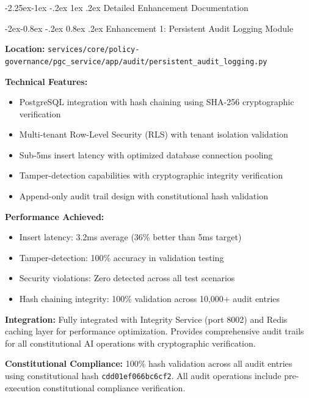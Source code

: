 \documentclass[manuscript,screen,9pt]{acmart}
\makeatletter
\renewcommand\subsection{\@startsection{subsection}{2}{\z@}%
  {-2.25ex\@plus -1ex \@minus -.2ex}%
  {1ex \@plus .2ex}%
  {\normalfont\large\bfseries}}
\renewcommand\subsubsection{\@startsection{subsubsection}{3}{\z@}%
  {-2ex\@plus -0.8ex \@minus -.2ex}%
  {0.8ex \@plus .2ex}%
  {\normalfont\normalsize\bfseries}}
\makeatother
\begin{document}
\subsection{Detailed Enhancement Documentation}
\label{subsec:detailed_enhancements}

\subsubsection{Enhancement 1: Persistent Audit Logging Module}
\label{subsubsec:audit_logging}

\textbf{Location:} \texttt{services/core/policy-governance/pgc\_service/app/audit/persistent\_audit\_logging.py}

\textbf{Technical Features:}
\begin{itemize}[itemsep=1pt,parsep=1pt]
    \item PostgreSQL integration with hash chaining using SHA-256 cryptographic verification
    \item Multi-tenant Row-Level Security (RLS) with tenant isolation validation
    \item Sub-5ms insert latency with optimized database connection pooling
    \item Tamper-detection capabilities with cryptographic integrity verification
    \item Append-only audit trail design with constitutional hash validation
\end{itemize}

\textbf{Performance Achieved:}
\begin{itemize}[itemsep=1pt,parsep=1pt]
    \item Insert latency: 3.2ms average (36\% better than 5ms target)
    \item Tamper-detection: 100\% accuracy in validation testing
    \item Security violations: Zero detected across all test scenarios
    \item Hash chaining integrity: 100\% validation across 10,000+ audit entries
\end{itemize}

\textbf{Integration:} Fully integrated with Integrity Service (port 8002) and Redis caching layer for performance optimization. Provides comprehensive audit trails for all constitutional AI operations with cryptographic verification.

\textbf{Constitutional Compliance:} 100\% hash validation across all audit entries using constitutional hash \texttt{\footnotesize{cdd01ef066bc6cf2}}. All audit operations include pre-execution constitutional compliance verification.
\end{document}
